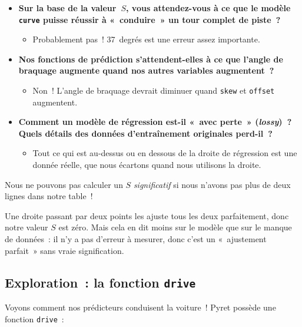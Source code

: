 \documentclass[12pt,a4paper]{article}
\begin{document}
\begin{thinkbox}
  \begin{itemize}
    \item \textbf{Sur la base de la valeur~$S$, vous attendez-vous à ce que le modèle \texttt{curve} puisse réussir à «~conduire~» un tour complet de piste~?}
    \begin{itemize}
      \item Probablement pas~! 37~degrés est une erreur assez importante.
    \end{itemize}
    \item \textbf{Nos fonctions de prédiction s'attendent-elles à ce que l'angle de braquage augmente quand nos autres variables augmentent~?}
    \begin{itemize}
      \item Non~! L'angle de braquage devrait diminuer quand \texttt{skew} et \texttt{offset} augmentent.
    \end{itemize}
    \item \textbf{Comment un modèle de régression est-il «~avec perte~» (\emph{lossy})~? Quels détails des données d'entraînement originales perd-il~?}
    \begin{itemize}
      \item Tout ce qui est au-dessus ou en dessous de la droite de régression est une donnée réelle, que nous écartons quand nous utilisons la droite.
    \end{itemize}
  \end{itemize}
\end{thinkbox}

\begin{instructornotes}
  Nous ne pouvons pas calculer un $S$ \emph{significatif} si nous n'avons pas plus de deux lignes dans notre table~!

  Une droite passant par deux points les ajuste tous les deux parfaitement, donc notre valeur $S$ est zéro. Mais cela en dit moins sur le modèle que sur le manque de données~: il n'y a pas d'erreur à mesurer, donc c'est un «~ajustement parfait~» sans vraie signification.
\end{instructornotes}

\subsection{Exploration~: la fonction \texttt{drive}}

Voyons comment nos prédicteurs conduisent la voiture~! Pyret possède une fonction \texttt{drive}~:
\end{document}
